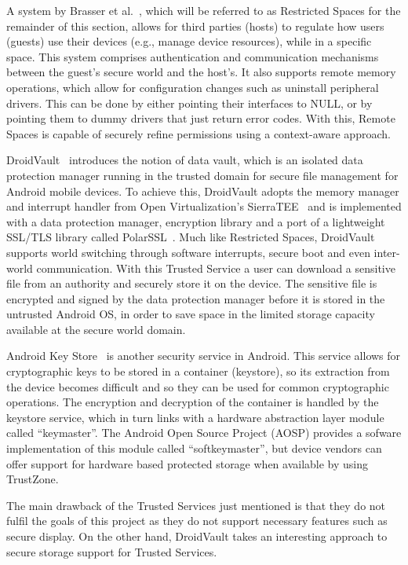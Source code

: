 A system by Brasser et al.~\cite{brasserregulating}, which will be referred to as Restricted Spaces for the remainder of this section, allows for third parties (hosts) to regulate how users (guests) use their devices (e.g., manage device resources), while in a specific space. This system comprises authentication and communication mechanisms between the guest's secure world and the host's. It also supports remote memory operations, which allow for configuration changes such as uninstall peripheral drivers. This can be done by either pointing their interfaces to NULL, or by pointing them to dummy drivers that just return error codes. With this, Remote Spaces is capable of securely refine permissions using a context-aware approach.

DroidVault~\cite{li2014droidvault} introduces the notion of data vault, which is an isolated data protection manager running in the trusted domain for secure file management for Android mobile devices. To achieve this, DroidVault adopts the memory manager and interrupt handler from Open Virtualization's SierraTEE~\cite{sierra_tee} and is implemented with a data protection manager, encryption library and a port of a lightweight SSL/TLS library called PolarSSL~\cite{polar}. Much like Restricted Spaces, DroidVault supports world switching through software interrupts, secure boot and even inter-world communication. With this Trusted Service a user can download a sensitive file from an authority and securely store it on the device. The sensitive file is encrypted and signed by the data protection manager before it is stored in the untrusted Android OS, in order to save space in the limited storage capacity available at the secure world domain.

Android Key Store~\cite{aks} is another security service in Android. This service allows for cryptographic keys to be stored in a container (keystore), so its extraction from the device becomes difficult and so they can be used for common cryptographic operations. The encryption and decryption of the container is handled by the keystore service, which in turn links with a hardware abstraction layer module called ``keymaster''. The Android Open Source Project (AOSP) provides a sofware implementation of this module called ``softkeymaster'', but device vendors can offer support for hardware based protected storage when available by using TrustZone.

The main drawback of the Trusted Services just mentioned is that they do not fulfil the goals of this project as they do not support necessary features such as secure display. On the other hand, DroidVault takes an interesting approach to secure storage support for Trusted Services.

